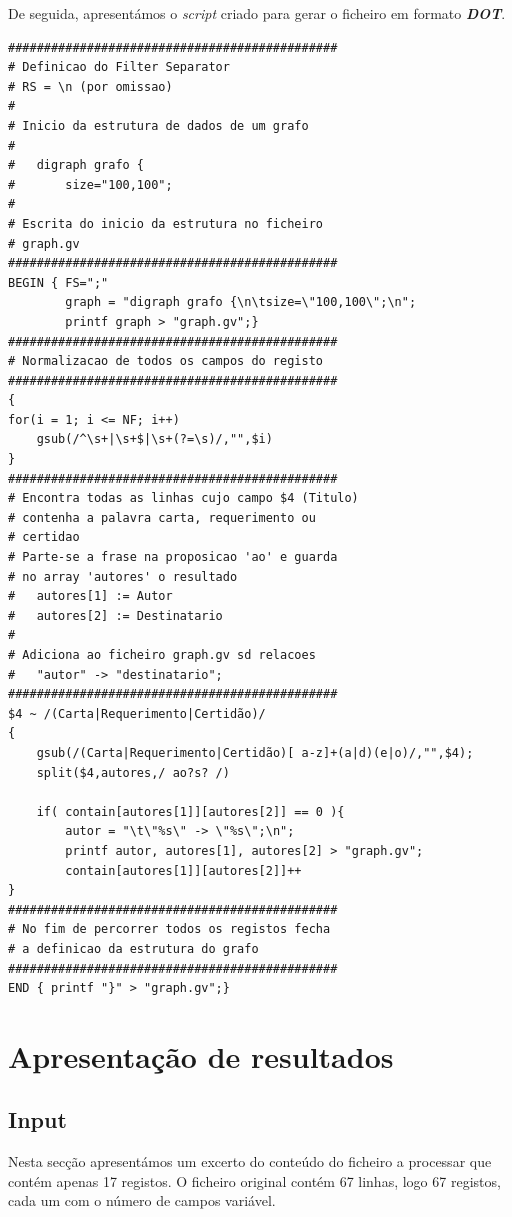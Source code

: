 \documentclass[11pt,a4paper]{report}
\begin{document}
\quad De seguida, apresentámos o \textit{script} criado para gerar o ficheiro em formato \textbf{\textit{DOT}}.
\newpage 
\small{
\begin{verbatim}
##############################################
# Definicao do Filter Separator
# RS = \n (por omissao)
#
# Inicio da estrutura de dados de um grafo
#
#	digraph grafo {
#		size="100,100";
#
# Escrita do inicio da estrutura no ficheiro
# graph.gv
##############################################
BEGIN { FS=";"
        graph = "digraph grafo {\n\tsize=\"100,100\";\n";
        printf graph > "graph.gv";}
##############################################
# Normalizacao de todos os campos do registo
##############################################
{ 	
for(i = 1; i <= NF; i++) 
    gsub(/^\s+|\s+$|\s+(?=\s)/,"",$i)
}
##############################################
# Encontra todas as linhas cujo campo $4 (Titulo)  
# contenha a palavra carta, requerimento ou 
# certidao 
# Parte-se a frase na proposicao 'ao' e guarda
# no array 'autores' o resultado
#   autores[1] := Autor
#   autores[2] := Destinatario
#
# Adiciona ao ficheiro graph.gv sd relacoes
#	"autor" -> "destinatario";
##############################################
$4 ~ /(Carta|Requerimento|Certidão)/ 
{	
    gsub(/(Carta|Requerimento|Certidão)[ a-z]+(a|d)(e|o)/,"",$4);
    split($4,autores,/ ao?s? /)
					
    if( contain[autores[1]][autores[2]] == 0 ){
        autor = "\t\"%s\" -> \"%s\";\n";
        printf autor, autores[1], autores[2] > "graph.gv";
        contain[autores[1]][autores[2]]++
}
##############################################
# No fim de percorrer todos os registos fecha
# a definicao da estrutura do grafo
##############################################
END { printf "}" > "graph.gv";}
\end{verbatim}}

\chapter{Apresentação de resultados}
\section{Input}

\qquad Nesta secção apresentámos um excerto do conteúdo do ficheiro a processar que contém apenas 17 registos. O ficheiro original contém 67 linhas, logo 67 registos, cada um com o número de campos variável.
\end{document}
